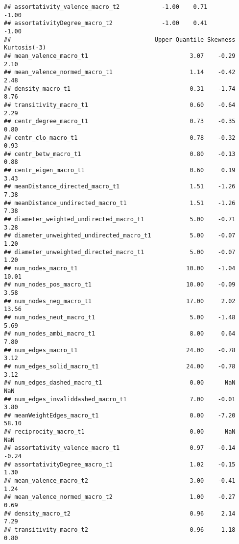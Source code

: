 \documentclass[
]{article}
\begin{document}
\begin{verbatim}
## assortativity_valence_macro_t2            -1.00    0.71          -1.00
## assortativityDegree_macro_t2              -1.00    0.41          -1.00
##                                         Upper Quantile Skewness Kurtosis(-3)
## mean_valence_macro_t1                             3.07    -0.29         2.10
## mean_valence_normed_macro_t1                      1.14    -0.42         2.48
## density_macro_t1                                  0.31    -1.74         8.76
## transitivity_macro_t1                             0.60    -0.64         2.29
## centr_degree_macro_t1                             0.73    -0.35         0.80
## centr_clo_macro_t1                                0.78    -0.32         0.93
## centr_betw_macro_t1                               0.80    -0.13         0.88
## centr_eigen_macro_t1                              0.60     0.19         3.43
## meanDistance_directed_macro_t1                    1.51    -1.26         7.38
## meanDistance_undirected_macro_t1                  1.51    -1.26         7.38
## diameter_weighted_undirected_macro_t1             5.00    -0.71         3.28
## diameter_unweighted_undirected_macro_t1           5.00    -0.07         1.20
## diameter_unweighted_directed_macro_t1             5.00    -0.07         1.20
## num_nodes_macro_t1                               10.00    -1.04        10.01
## num_nodes_pos_macro_t1                           10.00    -0.09         3.58
## num_nodes_neg_macro_t1                           17.00     2.02        13.56
## num_nodes_neut_macro_t1                           5.00    -1.48         5.69
## num_nodes_ambi_macro_t1                           8.00     0.64         7.80
## num_edges_macro_t1                               24.00    -0.78         3.12
## num_edges_solid_macro_t1                         24.00    -0.78         3.12
## num_edges_dashed_macro_t1                         0.00      NaN          NaN
## num_edges_invaliddashed_macro_t1                  7.00    -0.01         3.80
## meanWeightEdges_macro_t1                          0.00    -7.20        58.10
## reciprocity_macro_t1                              0.00      NaN          NaN
## assortativity_valence_macro_t1                    0.97    -0.14        -0.24
## assortativityDegree_macro_t1                      1.02    -0.15         1.30
## mean_valence_macro_t2                             3.00    -0.41         1.24
## mean_valence_normed_macro_t2                      1.00    -0.27         0.69
## density_macro_t2                                  0.96     2.14         7.29
## transitivity_macro_t2                             0.96     1.18         0.80

\end{verbatim}
\end{document}
